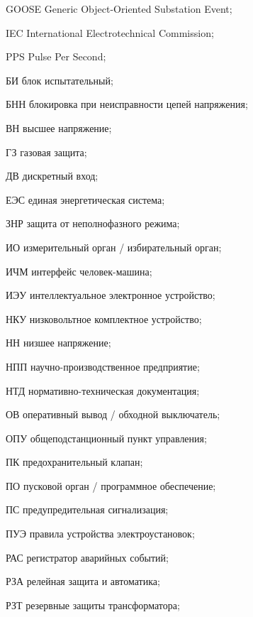 \begin{list}{}%
{%
  \setlength{\labelwidth}{\abbrwidth}%
  \setlength{\labelsep}{0pt}%
  \setlength{\leftmargin}{\dimexpr\labelwidth+\labelsep\relax}%
  \setlength{\itemindent}{0pt}%
  \setlength{\parsep}{0pt}%
  \setlength{\itemsep}{0pt}
  \renewcommand{\makelabel}[1]{#1 --\hspace{\abbrgap}}%
}
\item[GOOSE] Generic Object-Oriented Substation Event;
\item[IEC]  International Electrotechnical Commission;
\item[PPS] Pulse Per Second;
\item[БИ] блок испытательный;
\item[БНН] блокировка при неисправности цепей напряжения;
\item[ВН] высшее напряжение;
\item[ГЗ] газовая защита;
\item[ДВ] дискретный вход;
\item[ЕЭС] единая энергетическая система;
\item[ЗНР] защита от неполнофазного режима;
\item[ИО] измерительный орган / избирательный орган;
\item[ИЧМ] интерфейс человек-машина;
\item[ИЭУ] интеллектуальное электронное устройство;
\item[НКУ] низковольтное комплектное устройство;
\item[НН] низшее напряжение;
\item[НПП] научно-производственное предприятие;
\item[НТД] нормативно-техническая документация;
\item[ОВ] оперативный вывод / обходной выключатель;
\item[ОПУ] общеподстанционный пункт управления;
\item[ПК] предохранительный клапан;
\item[ПО] пусковой орган / программное обеспечение;
\item[ПС] предупредительная сигнализация;
\item[ПУЭ] правила устройства электроустановок;
\item[РАС] регистратор аварийных событий;
\item[РЗА] релейная защита и автоматика;
\item[РЗТ] резервные защиты трансформатора;

\end{list}
